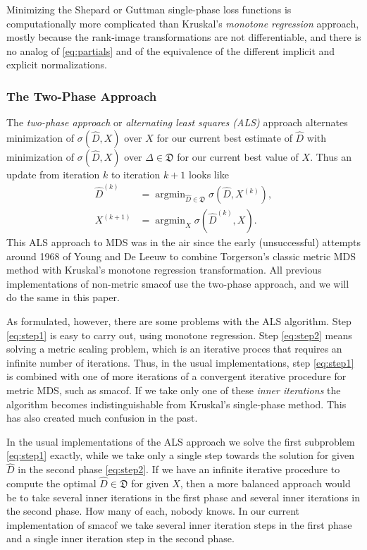 \documentclass[
  12pt,
]{article}
\begin{document}
Minimizing the Shepard or Guttman single-phase loss functions is
computationally more complicated than Kruskal's \emph{monotone regression}
approach, mostly because the rank-image transformations are not
differentiable, and there is no analog of \eqref{eq:partials} and of the
equivalence of the different implicit and explicit normalizations.

\subsubsection{The Two-Phase Approach}\label{the-two-phase-approach}

The \emph{two-phase approach} or \emph{alternating least squares (ALS)} approach
alternates minimization of \(\sigma(\hat D,X)\) over \(X\) for our current
best estimate of \(\hat D\) with minimization of \(\sigma(\hat D,X)\) over
\(\Delta\in\mathfrak{D}\) for our current best value of \(X\). Thus an
update from iteration \(k\) to iteration \(k+1\) looks like \begin{align}
\hat D^{(k)}&=\mathop{\text{argmin}}_{\hat D\in\mathfrak{D}}\sigma(\hat D,X^{(k)}),\label{eq:step1}\\
X^{(k+1)}&=\mathop{\text{argmin}}_X\sigma(\hat D^{(k)},X).\label{eq:step2}
\end{align} This ALS approach to MDS was in the air since the early
(unsuccessful) attempts around 1968 of Young and De Leeuw to combine
Torgerson's classic metric MDS method with Kruskal's monotone regression
transformation. All previous implementations of non-metric smacof use
the two-phase approach, and we will do the same in this paper.

As formulated, however, there are some problems with the ALS algorithm.
Step \eqref{eq:step1} is easy to carry out, using monotone regression.
Step \eqref{eq:step2} means solving a metric scaling problem, which is an
iterative proces that requires an infinite number of iterations. Thus,
in the usual implementations, step \eqref{eq:step1} is combined with one
of more iterations of a convergent iterative procedure for metric MDS,
such as smacof. If we take only one of these \emph{inner iterations} the
algorithm becomes indistinguishable from Kruskal's single-phase method.
This has also created much confusion in the past.

In the usual implementations of the ALS approach we solve the first
subproblem \eqref{eq:step1} exactly, while we take only a single step
towards the solution for given \(\hat D\) in the second phase
\eqref{eq:step2}. If we have an infinite iterative procedure to compute
the optimal \(\hat D\in\mathfrak{D}\) for given \(X\), then a more balanced
approach would be to take several inner iterations in the first phase
and several inner iterations in the second phase. How many of each,
nobody knows. In our current implementation of smacof we take several
inner iteration steps in the first phase and a single inner iteration
step in the second phase.
\end{document}
